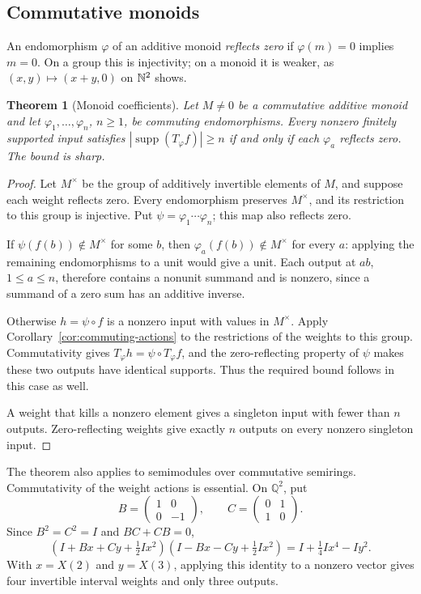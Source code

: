 \documentclass[11pt]{article}
\DeclareMathOperator{\supp}{supp}\DeclareMathOperator{\rank}{rank}
\numberwithin{equation}{section}
\newtheorem{theorem}{Theorem}[section]
\theoremstyle{definition}\newtheorem{definition}[theorem]{Definition}
\theoremstyle{remark}\newtheorem{remark}[theorem]{Remark}
\begin{document}
\subsection{Commutative monoids}

An endomorphism $\varphi$ of an additive monoid \emph{reflects zero}
if $\varphi(m)=0$ implies $m=0$. On a group this is injectivity;
on a monoid it is weaker, as $(x,y)\mapsto(x+y,0)$ on $\mathbb N^2$ shows.

\begin{theorem}[Monoid coefficients]\label{thm:monoid}
\label{thm:monoid-main}
Let $M\ne0$ be a commutative additive monoid and let
$\varphi_1,\ldots,\varphi_n$, $n\ge1$, be commuting
endomorphisms. Every nonzero finitely supported input satisfies
$|\supp(T_\varphi f)|\ge n$ if and only if each $\varphi_a$
reflects zero. The bound is sharp.
\end{theorem}
\begin{proof}
Let $M^\times$ be the group of additively invertible elements of $M$,
and suppose each weight reflects zero. Every endomorphism preserves
$M^\times$, and its restriction to this group is injective. Put
$\psi=\varphi_1\cdots\varphi_n$; this map also reflects zero.

If $\psi(f(b))\notin M^\times$ for some $b$, then
$\varphi_a(f(b))\notin M^\times$ for every $a$: applying the remaining
endomorphisms to a unit would give a unit. Each output at $ab$,
$1\le a\le n$, therefore contains a nonunit summand and is nonzero,
since a summand of a zero sum has an additive inverse.

Otherwise $h=\psi\circ f$ is a nonzero input with values in
$M^\times$. Apply Corollary~\ref{cor:commuting-actions} to the
restrictions of the weights to this group. Commutativity gives
$T_\varphi h=\psi\circ T_\varphi f$, and the zero-reflecting property
of $\psi$ makes these two outputs have identical supports.
Thus the required bound follows in this case as well.

A weight that kills a nonzero element gives a singleton input with
fewer than $n$ outputs. Zero-reflecting weights give exactly $n$
outputs on every nonzero singleton input.
\end{proof}

The theorem also applies to semimodules over commutative semirings.
Commutativity of the weight actions is essential. On $\mathbb Q^2$, put
\[
 B=\begin{pmatrix}1&0\\0&-1\end{pmatrix},\qquad
 C=\begin{pmatrix}0&1\\1&0\end{pmatrix}.
\]
Since $B^2=C^2=I$ and $BC+CB=0$,
\[
 (I+Bx+Cy+\tfrac12Ix^2)(I-Bx-Cy+\tfrac12Ix^2)
 =I+\tfrac14Ix^4-Iy^2.
\]
With $x=X(2)$ and $y=X(3)$, applying this identity to a nonzero
vector gives four invertible interval weights and only three outputs.
\end{document}
